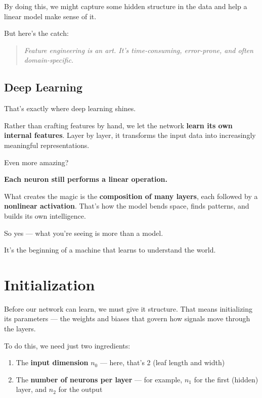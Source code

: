 \documentclass[11pt]{article}
\begin{document}
By doing this, we might capture some hidden structure in the data and help a linear model make sense of it.

But here's the catch:

\begin{quote}
\textit{Feature engineering is an art. It's time-consuming, error-prone, and often domain-specific.}
\end{quote}

\subsection*{Deep Learning}

That's exactly where deep learning shines.

Rather than crafting features by hand, we let the network \textbf{learn its own internal features}.  
Layer by layer, it transforms the input data into increasingly meaningful representations.

Even more amazing?  
\begin{center}
\textbf{Each neuron still performs a linear operation.}
\end{center}

What creates the magic is the \textbf{composition of many layers},  
each followed by a \textbf{nonlinear activation}. That’s how the model bends space, finds patterns, and builds its own intelligence.

So yes — what you’re seeing is more than a model.

It’s the beginning of a machine that learns to understand the world.

\section*{Initialization}

Before our network can learn, we must give it structure. That means initializing its parameters — the weights and biases that govern how signals move through the layers.

To do this, we need just two ingredients:
\begin{enumerate}
    \item The \textbf{input dimension} $n_0$ — here, that’s 2 (leaf length and width)
    \item The \textbf{number of neurons per layer} — for example, $n_1$ for the first (hidden) layer, and $n_2$ for the output
\end{enumerate}
\end{document}
